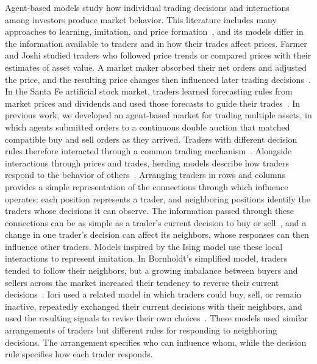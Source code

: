 Agent-based models study how individual trading decisions and
interactions among investors produce market behavior. This literature
includes many approaches to learning, imitation, and price
formation~\cite{samanidou2007agent,axtell2025agent}, and its models
differ in the information available to traders and in how their trades
affect prices. Farmer and Joshi studied traders who followed price
trends or compared prices with their estimates of asset value. A market
maker absorbed their net orders and adjusted the price, and the
resulting price changes then influenced later trading
decisions~\cite{farmer2002price}. In the Santa Fe artificial stock
market, traders learned forecasting rules from market prices and
dividends and used those forecasts to guide their
trades~\cite{lebaron1999time}. In previous work, we developed an
agent-based market for trading multiple assets, in which agents
submitted orders to a continuous double auction that matched compatible
buy and sell orders as they arrived. Traders with different decision
rules therefore interacted through a common trading
mechanism~\cite{wheeler2023scalable}. Alongside interactions through
prices and trades, herding models describe how traders respond to the
behavior of others~\cite{kirman1993ants,cont2000herd,lux1999scaling}.
Arranging traders in rows and columns provides a simple representation
of the connections through which influence operates: each position
represents a trader, and neighboring positions identify the traders
whose decisions it can observe. The information passed through these
connections can be as simple as a trader's current decision to buy or
sell~\cite{iori2002microsimulation}, and a change in one trader's
decision can affect its neighbors, whose responses can then influence
other traders. Models inspired by the Ising model use these local
interactions to represent imitation. In Bornholdt's simplified model,
traders tended to follow their neighbors, but a growing imbalance
between buyers and sellers across the market increased their tendency
to reverse their current decisions~\cite{bornholdt2001ising}. Iori used
a related model in which traders could buy, sell, or remain inactive,
repeatedly exchanged their current decisions with their neighbors, and
used the resulting signals to revise their own
choices~\cite{iori2002microsimulation}. These models used similar
arrangements of traders but different rules for responding to
neighboring decisions. The arrangement specifies who can influence
whom, while the decision rule specifies how each trader responds.

